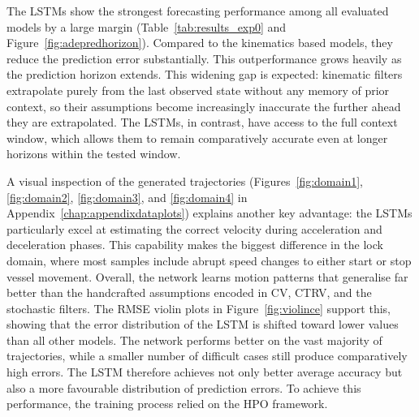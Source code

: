 The \acp{LSTM} show the strongest forecasting performance among all evaluated models by a large margin (Table~\ref{tab:results_exp0} and Figure~\ref{fig:adepredhorizon}).
Compared to the kinematics based models, they reduce the prediction error substantially.
This outperformance grows heavily as the prediction horizon extends.
This widening gap is expected: kinematic filters extrapolate purely from the last observed state without any memory of prior context, so their assumptions become increasingly inaccurate the further ahead they are extrapolated.
The \acp{LSTM}, in contrast, have access to the full context window, which allows them to remain comparatively accurate even at longer horizons within the tested window.

A visual inspection of the generated trajectories (Figures~\ref{fig:domain1}, \ref{fig:domain2}, \ref{fig:domain3}, and \ref{fig:domain4} in Appendix~\ref{chap:appendixdataplots}) explains another key advantage: the \acp{LSTM} particularly excel at estimating the correct velocity during acceleration and deceleration phases.
This capability makes the biggest difference in the lock domain, where most samples include abrupt speed changes to either start or stop vessel movement.
Overall, the network learns motion patterns that generalise far better than the handcrafted assumptions encoded in \ac{CV}, \ac{CTRV}, and the stochastic filters.
The \ac{RMSE} violin plots in Figure~\ref{fig:violince} support this, showing that the error distribution of the \ac{LSTM} is shifted toward lower values than all other models.
The network performs better on the vast majority of trajectories, while a smaller number of difficult cases still produce comparatively high errors.
The \ac{LSTM} therefore achieves not only better average accuracy but also a more favourable distribution of prediction errors.
To achieve this performance, the training process relied on the \ac{HPO} framework.

